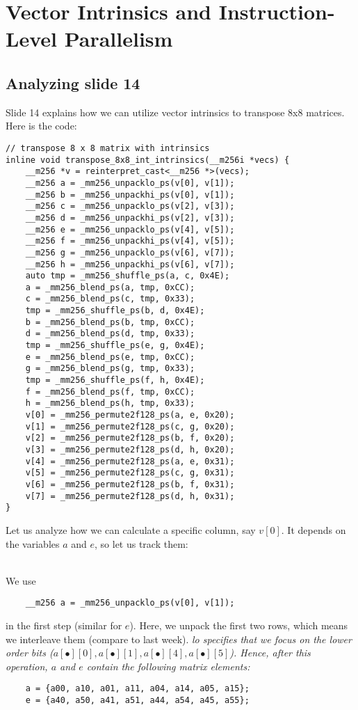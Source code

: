 \documentclass[../../main.tex]{subfiles}
\begin{document}
    \section{Vector Intrinsics and Instruction-Level Parallelism}
    \subsection{Analyzing slide 14}
    Slide 14 explains how we can utilize vector intrinsics to transpose 8x8 matrices. Here is the code:
    \begin{lstlisting}
// transpose 8 x 8 matrix with intrinsics
inline void transpose_8x8_int_intrinsics(__m256i *vecs) {
    __m256 *v = reinterpret_cast<__m256 *>(vecs);
    __m256 a = _mm256_unpacklo_ps(v[0], v[1]);
    __m256 b = _mm256_unpackhi_ps(v[0], v[1]);
    __m256 c = _mm256_unpacklo_ps(v[2], v[3]);
    __m256 d = _mm256_unpackhi_ps(v[2], v[3]);
    __m256 e = _mm256_unpacklo_ps(v[4], v[5]);
    __m256 f = _mm256_unpackhi_ps(v[4], v[5]);
    __m256 g = _mm256_unpacklo_ps(v[6], v[7]);
    __m256 h = _mm256_unpackhi_ps(v[6], v[7]);
    auto tmp = _mm256_shuffle_ps(a, c, 0x4E);
    a = _mm256_blend_ps(a, tmp, 0xCC);
    c = _mm256_blend_ps(c, tmp, 0x33);
    tmp = _mm256_shuffle_ps(b, d, 0x4E);
    b = _mm256_blend_ps(b, tmp, 0xCC);
    d = _mm256_blend_ps(d, tmp, 0x33);
    tmp = _mm256_shuffle_ps(e, g, 0x4E);
    e = _mm256_blend_ps(e, tmp, 0xCC);
    g = _mm256_blend_ps(g, tmp, 0x33);
    tmp = _mm256_shuffle_ps(f, h, 0x4E);
    f = _mm256_blend_ps(f, tmp, 0xCC);
    h = _mm256_blend_ps(h, tmp, 0x33);
    v[0] = _mm256_permute2f128_ps(a, e, 0x20);
    v[1] = _mm256_permute2f128_ps(c, g, 0x20);
    v[2] = _mm256_permute2f128_ps(b, f, 0x20);
    v[3] = _mm256_permute2f128_ps(d, h, 0x20);
    v[4] = _mm256_permute2f128_ps(a, e, 0x31);
    v[5] = _mm256_permute2f128_ps(c, g, 0x31);
    v[6] = _mm256_permute2f128_ps(b, f, 0x31);
    v[7] = _mm256_permute2f128_ps(d, h, 0x31);
}
    \end{lstlisting}
Let us analyze how we can calculate a specific column, say $v[0]$. It depends on the variables $a$ and $e$, so let us track them:

~\\
We use
\begin{lstlisting}
    __m256 a = _mm256_unpacklo_ps(v[0], v[1]);
\end{lstlisting}
in the first step (similar for $e$). Here, we unpack the first two rows, which means we interleave them (compare to last week). \em lo \em specifies that we focus on the \em lower order bits \em ($a[\bullet][0], a[\bullet][1], a[\bullet][4], a[\bullet][5]$). Hence, after this operation, $a$ and $e$ contain the following matrix elements:
\begin{lstlisting}
    a = {a00, a10, a01, a11, a04, a14, a05, a15};
    e = {a40, a50, a41, a51, a44, a54, a45, a55};
\end{lstlisting}
\end{document}
